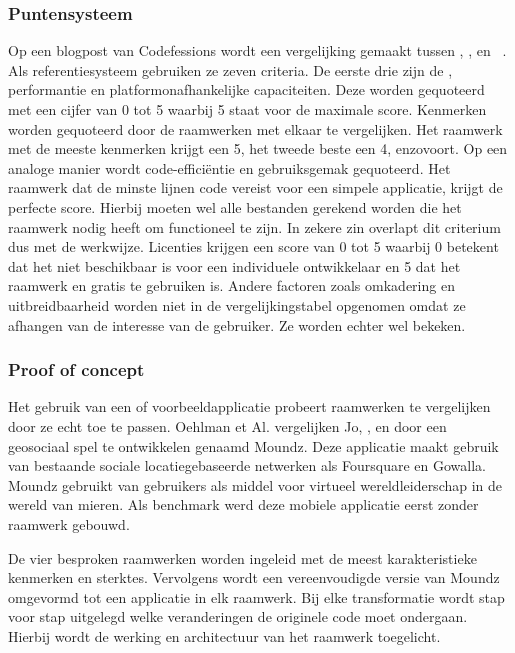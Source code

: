 \subsubsection{Puntensysteem}
\label{sec:manier-puntensysteem}
Op een blogpost van Codefessions wordt een vergelijking gemaakt tussen \jqm{}, \st{}, \jqt{} en \kendo{}~\cite{Sarrafi2012a}.  
Als referentiesysteem gebruiken ze zeven criteria.  
De eerste drie zijn de , performantie en platformonafhankelijke capaciteiten.  
Deze worden gequoteerd met een cijfer van 0 tot 5 waarbij 5 staat voor de maximale score.
Kenmerken worden gequoteerd door de raamwerken met elkaar te vergelijken.  
Het raamwerk met de meeste kenmerken krijgt een 5, het tweede beste een 4, enzovoort. 
Op een analoge manier wordt code-efficiëntie en gebruiksgemak gequoteerd.  
Het raamwerk dat de minste lijnen code vereist voor een simpele applicatie, krijgt de perfecte score. 
Hierbij moeten wel alle bestanden gerekend worden die het raamwerk nodig heeft om functioneel te zijn. 
In zekere zin overlapt dit criterium dus met de  werkwijze.
Licenties krijgen een score van 0 tot 5 waarbij 0 betekent dat het niet beschikbaar is voor een individuele ontwikkelaar en 5 dat het raamwerk  en gratis te gebruiken is. 
Andere factoren zoals omkadering en uitbreidbaarheid worden niet in de vergelijkingstabel opgenomen omdat ze afhangen van de interesse van de gebruiker.  
Ze worden echter wel bekeken.

\subsubsection{Proof of concept}
\label{sec:manier-poc}
Het gebruik van een  of voorbeeldapplicatie probeert raamwerken te vergelijken door ze echt toe te passen.
Oehlman et Al. vergelijken Jo, \jqt{},  \jqm{} en \st{} door een geosociaal spel te ontwikkelen genaamd Moundz. 
Deze applicatie maakt gebruik van bestaande sociale locatiegebaseerde netwerken als Foursquare en Gowalla.
Moundz gebruikt  van gebruikers als middel voor virtueel wereldleiderschap in de wereld van mieren.
Als benchmark werd deze mobiele applicatie eerst zonder raamwerk gebouwd.

De vier besproken raamwerken worden ingeleid met de meest karakteristieke kenmerken en sterktes.
Vervolgens wordt een vereenvoudigde versie van Moundz omgevormd tot een applicatie in elk raamwerk.
Bij elke transformatie wordt stap voor stap uitgelegd welke veranderingen de originele code moet ondergaan.
Hierbij wordt de werking en architectuur van het raamwerk toegelicht.

